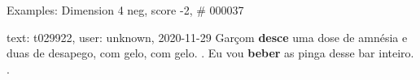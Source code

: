 \begin{frame}{Examples: Dimension 4 neg, score -2, \# 000037}
\footnotesize
\begin{alertblock}{text: t029922, user: unknown, 2020-11-29}
Garçom \textbf{desce} uma dose de amnésia e duas de desapego, com gelo, com 
gelo. . Eu vou \textbf{beber} as pinga desse bar inteiro. . 
\end{alertblock}
\end{frame}
